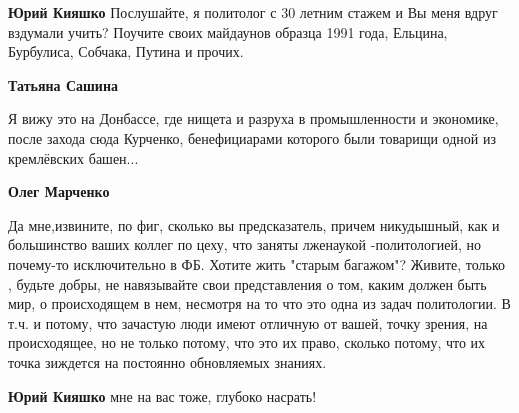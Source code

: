 \begin{itemize}
\begin{itemize}
 
\textbf{Юрий Кияшко} Послушайте, я политолог с 30 летним стажем и Вы меня вдруг вздумали учить? Поучите своих майдаунов образца 1991 года, Ельцина, Бурбулиса, Собчака, Путина и прочих.

 
\textbf{Татьяна Сашина}

Я вижу это на Донбассе, где нищета и разруха в промышленности и экономике,
после захода сюда Курченко, бенефициарами которого были товарищи одной из
кремлёвских башен...

 
\textbf{Олег Марченко} 

Да мне,извините, по фиг, сколько вы предсказатель, причем никудышный, как и
большинство ваших коллег по цеху, что заняты лженаукой -политологией, но
почему-то исключительно в ФБ. Хотите жить "старым багажом"? Живите, только ,
будьте добры, не навязывайте свои представления о том, каким должен быть мир, о
происходящем в нем, несмотря на то что это одна из задач политологии. В т.ч. и
потому, что зачастую люди имеют отличную от вашей, точку зрения, на
происходящее, но не только потому, что это их право, сколько потому, что их
точка зиждется на постоянно обновляемых знаниях.


 
\textbf{Юрий Кияшко} мне на вас тоже, глубоко насрать!

 

\end{itemize}
\end{itemize}
